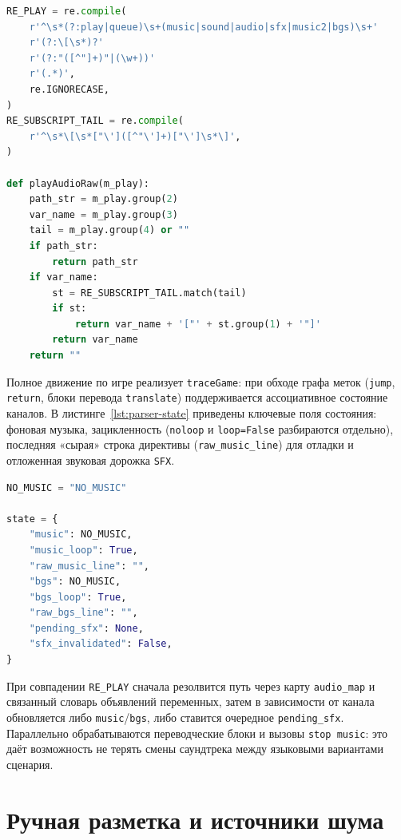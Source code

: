 \begin{lstlisting}[language=Python, caption={Фрагмент \texttt{trace\_labels.py}: директивы \texttt{play}/\texttt{queue} и извлечение необработанной ссылки на аудио.},label=lst:regex-play]
RE_PLAY = re.compile(
    r'^\s*(?:play|queue)\s+(music|sound|audio|sfx|music2|bgs)\s+'
    r'(?:\[\s*)?'
    r'(?:"([^"]+)"|(\w+))'
    r'(.*)',
    re.IGNORECASE,
)
RE_SUBSCRIPT_TAIL = re.compile(
    r'^\s*\[\s*["\']([^"\']+)["\']\s*\]',
)

def playAudioRaw(m_play):
    path_str = m_play.group(2)
    var_name = m_play.group(3)
    tail = m_play.group(4) or ""
    if path_str:
        return path_str
    if var_name:
        st = RE_SUBSCRIPT_TAIL.match(tail)
        if st:
            return var_name + '["' + st.group(1) + '"]'
        return var_name
    return ""
\end{lstlisting}

Полное движение по игре реализует \texttt{traceGame}: при обходе графа меток (\texttt{jump}, \texttt{return}, блоки перевода \texttt{translate}) поддерживается ассоциативное состояние каналов. В листинге~\ref{lst:parser-state} приведены ключевые поля состояния: фоновая музыка, зацикленность (\texttt{noloop} и \texttt{loop=False} разбираются отдельно), последняя «сырая» строка директивы (\texttt{raw\_music\_line}) для отладки и отложенная звуковая дорожка \texttt{SFX}.

\begin{lstlisting}[language=Python, caption={Фрагмент \texttt{trace\_labels.py}: состояние звуковых каналов в начале \texttt{traceGame}.},label=lst:parser-state]
NO_MUSIC = "NO_MUSIC"

state = {
    "music": NO_MUSIC,
    "music_loop": True,
    "raw_music_line": "",
    "bgs": NO_MUSIC,
    "bgs_loop": True,
    "raw_bgs_line": "",
    "pending_sfx": None,
    "sfx_invalidated": False,
}
\end{lstlisting}

При совпадении \texttt{RE\_PLAY} сначала резолвится путь через карту \texttt{audio\_map} и связанный словарь объявлений переменных, затем в зависимости от канала обновляется либо \texttt{music}/\texttt{bgs}, либо ставится очередное \texttt{pending\_sfx}. Параллельно обрабатываются переводческие блоки и вызовы \texttt{stop music}: это даёт возможность не терять смены саундтрека между языковыми вариантами сценария.

\section{Ручная разметка и источники шума}

